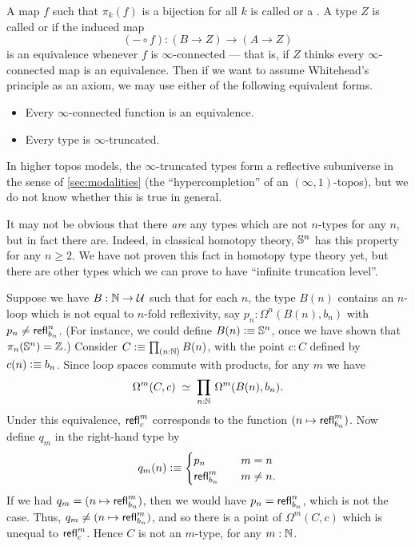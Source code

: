 A map $f$ such that $\pi_k(f)$ is a bijection for all $k$ is called %
%
or a .%
%
A type $Z$ is called %
%
or %
%
if the induced map
\[(-\circ f):(B\to Z) \to (A\to Z)\]
is an equivalence whenever $f$ is $\infty$-connected --- that is, if $Z$ thinks every $\infty$-connected map is an equivalence.
%
Then if we want to assume Whitehead's principle as an axiom, we may use either of the following equivalent forms.
\begin{itemize}
\item Every $\infty$-connected function is an equivalence.
\item Every type is $\infty$-truncated.
\end{itemize}
In higher topos models,
%
the $\infty$-truncated types form a reflective subuniverse in the sense of 
\autoref{sec:modalities} (the ``hypercompletion'' of an $(\infty,1)$-topos), but we do not know whether this is 
true in general.

%
%

It may not be obvious that there \emph{are} any types which are not $n$-types for any $n$, but in fact there are.
Indeed, in classical homotopy theory, $\mathbb{S}^n$ has this property for any $n\ge 2$.
We have not proven this fact in homotopy type theory yet, but there are other types which we can prove to have ``infinite truncation level''.

\begin{eg}
  Suppose we have $B:\mathbb{N}\to\mathcal{U}$ such that for each $n$, the type $B(n)$ contains an $n$-loop which is not equal to $n$-fold reflexivity, say $p_n:\Omega^n(B(n),b_n)$ with $p_n \neq \mathsf{refl}_{b_n}^n$.
  (For instance, we could define $B(n)\vcentcolon\equiv \mathbb{S}^n$, once we have shown that $\pi_n(\mathbb{S}^n)=\mathbb{Z}$.)
  Consider $C\defeq \prd{n:\nat} B(n)$, with the point $c:C$ defined by $c(n)\vcentcolon\equiv b_n$.
  Since loop spaces commute with products, for any $m$ we have
  \[\eqvspaced{\Omega^m (C,c)}{\prd{n:\nat}\Omega^m(B(n),b_n)}.\]
  Under this equivalence, $\mathsf{refl}_{c}^m$ corresponds to the function $(n\mapsto \mathsf{refl}_{b_n}^m)$.
  Now define $q_m$ in the right-hand type by
  \[ q_m(n) \vcentcolon\equiv
  \begin{cases}
    p_n &\quad m=n\\
    \mathsf{refl}_{b_n}^m &\quad m\neq n.
  \end{cases}
  \]
  If we had $q_m = (n\mapsto \mathsf{refl}_{b_n}^m)$, then we would have $p_n = \mathsf{refl}_{b_n}^n$, which is not the case.
  Thus, $q_m \neq (n\mapsto \mathsf{refl}_{b_n}^m)$, and so there is a point of $\Omega^m(C,c)$ which is unequal to $\mathsf{refl}_{c}^m$.
  Hence $C$ is not an $m$-type, for any $m:\mathbb{N}$.
\end{eg}

